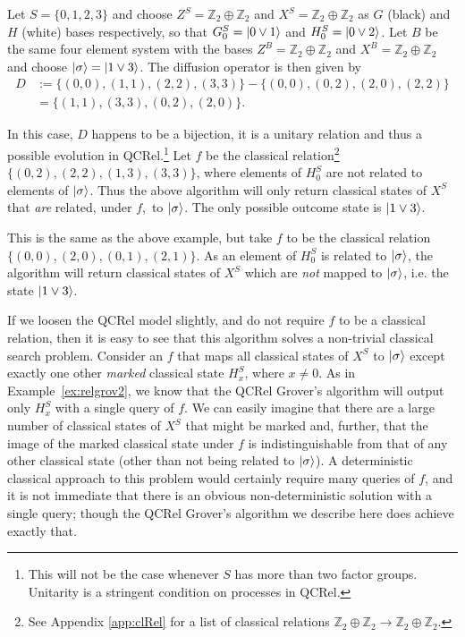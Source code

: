 \begin{example}
Let $S=\{0,1,2,3\}$ and choose $Z^S=\mathbb{Z}_2\oplus\mathbb{Z}_2$ and $X^S=\mathbb{Z}_2\oplus\mathbb{Z}_2$ as $G$ (black) and $H$ (white) bases respectively, so that $G^{S}_0=| 0\vee 1 \rangle$ and $H^S_0 = | 0\vee 2 \rangle$. Let $B$ be the same four element system with the bases $Z^B=\mathbb{Z}_2\oplus\mathbb{Z}_2$ and $X^B=\mathbb{Z}_2\oplus\mathbb{Z}_2$ and choose $| \sigma \rangle=| 1\vee 3 \rangle$. The diffusion operator is then given by
\begin{align*}
D &:= \{(0,0),(1,1),(2,2),(3,3)\}-\{(0,0),(0,2),(2,0),(2,2)\}
\\&=\{(1,1),(3,3),(0,2),(2,0)\}.
\end{align*}

In this case, $D$ happens to be a bijection, it is a unitary relation and thus a possible evolution in QCRel.\footnote{This will not be the case whenever $S$ has more than two factor groups. Unitarity is a stringent condition on processes in QCRel.} Let $f$ be the classical relation\footnote{See Appendix \ref{app:clRel} for a list of classical relations $\mathbb{Z}_2\oplus\mathbb{Z}_2\to\mathbb{Z}_2\oplus\mathbb{Z}_2$.} $\{(0,2),(2,2),(1,3),(3,3)\}$, where elements of $H^S_0$ are not related to elements of $| \sigma \rangle$. Thus the above algorithm will only return classical states of $X^{S}$ that \textit{are} related, under $f$,\ to $| \sigma \rangle$.  The only possible outcome state is $| 1\vee 3 \rangle$.
\end{example}

\begin{example}
\label{ex:relgrov2}
This is the same as the above example, but take $f$ to be the classical relation $\{(0,0),(2,0),(0,1),(2,1)\}$. As an element of $H^S_0$ is related to $| \sigma \rangle$, the algorithm will return classical states of $X^S$ which are \emph{not} mapped to $| \sigma \rangle$, i.e. the state $| 1\vee3 \rangle$.
\end{example}

If we loosen the QCRel model slightly, and do not require $f$ to be a classical relation, then it is easy to see that this algorithm solves a non-trivial classical search problem. Consider an $f$ that maps all classical states of $X^S$ to $| \sigma \rangle$  except exactly one other \emph{marked} classical state $H^S_x$, where $x\neq 0$. As in Example~\ref{ex:relgrov2}, we know that the QCRel Grover's algorithm will output only $H_x^S$ with a single query of $f$. We can easily imagine that there are a large number of classical states of $X^S$ that might be marked and, further, that the image of the marked classical state under $f$  is indistinguishable from that of any other classical state (other than not being related to $| \sigma \rangle$). A deterministic classical approach to this problem would certainly require many queries of $f$, and it is not immediate that there is an obvious non-deterministic solution with a single query; though the QCRel Grover's algorithm we describe here does achieve exactly that.

